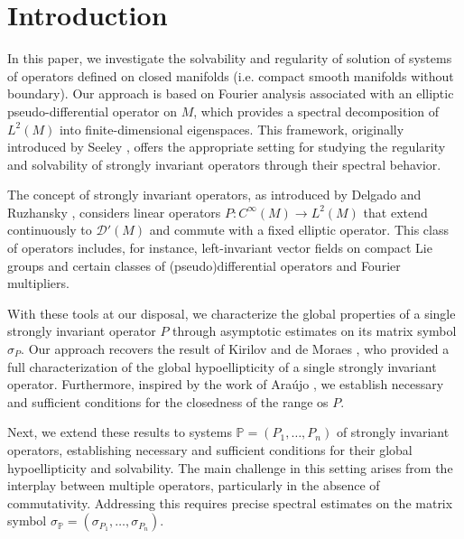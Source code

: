 \documentclass{amsart}
\theoremstyle{definition}
\theoremstyle{remark}
\numberwithin{equation}{section}
\begin{document}
	\maketitle
	

	\section{Introduction}

	In this paper, we investigate the solvability and regularity of solution of systems of operators defined on closed manifolds (i.e. compact smooth manifolds without boundary). Our approach is based on Fourier analysis associated with an elliptic pseudo-differential operator on $M$, which provides a spectral decomposition of $L^2(M)$ into finite-dimensional eigenspaces. This framework, originally introduced by Seeley \cite{See67}, offers the appropriate setting for studying the regularity and solvability of strongly invariant operators through their spectral behavior.  
	
	The concept of strongly invariant operators, as introduced by Delgado and Ruzhansky \cite{DR2018}, considers linear operators $P:C^\infty(M)\to L^2(M)$ that extend continuously to $\mathscr{D}'(M)$ and commute with a fixed elliptic operator. This class of operators includes, for instance, left-invariant vector fields on compact Lie groups and certain classes of (pseudo)differential operators and Fourier multipliers.  
	
	With these tools at our disposal, we characterize the global properties of a single strongly invariant operator $P$ through asymptotic estimates on its matrix symbol $\sigma_P$. Our approach recovers the result of Kirilov and de Moraes \cite{KM2020}, who provided a full characterization of the global hypoellipticity of a single strongly invariant operator. Furthermore, inspired by the work of Araújo \cite{Araujo2019}, we establish necessary and sufficient conditions for the closedness of the range os $P$.
	
	Next, we extend these results to systems $\mathbb{P}=(P_1,\ldots,P_n)$ of strongly invariant operators, establishing necessary and sufficient conditions for their global hypoellipticity and solvability. The main challenge in this setting arises from the interplay between multiple operators, particularly in the absence of commutativity. Addressing this requires precise spectral estimates on the matrix symbol $\sigma_\mathbb{P}=(\sigma_{P_1},\ldots,\sigma_{P_n})$.  
	
\end{document}
